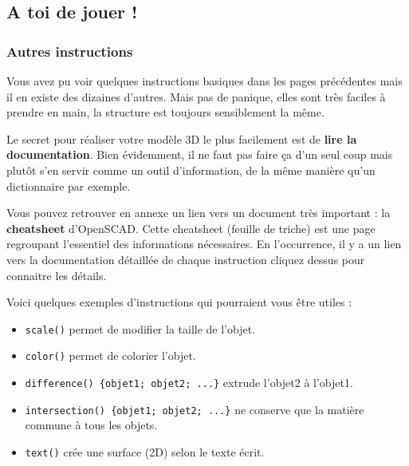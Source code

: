 


\subsection{A toi de jouer !}

\subsubsection{Autres instructions}

Vous avez pu voir quelques instructions basiques dans les pages précédentes mais il en existe des dizaines d'autres.
Mais pas de panique, elles sont très faciles à prendre en main, la structure est toujours sensiblement la même.

Le secret pour réaliser votre modèle 3D le plus facilement est de \textbf{lire la documentation}.
Bien évidemment, il ne faut pas faire ça d'un seul coup mais plutôt s'en servir comme un outil d'information, de la même manière qu'un dictionnaire par exemple.

Vous pouvez retrouver en annexe un lien vers un document très important : la \textbf{cheatsheet} d'OpenSCAD.
Cette cheatsheet (feuille de triche) est une page regroupant l'essentiel des informations nécessaires.
En l'occurrence, il y a un lien vers la documentation détaillée de chaque instruction cliquez dessus pour connaitre les détails.


\vspace{12pt}
Voici quelques exemples d'instructions qui pourraient vous être utiles :
\begin{itemize}
	\item \verb|scale()| permet de modifier la taille de l'objet.
	\item \verb|color()| permet de colorier l'objet.
	\item \verb|difference() {objet1; objet2; ...}| extrude l'objet2 à l'objet1.
	\item \verb|intersection() {objet1; objet2; ...}| ne conserve que la matière commune à tous les objets.
	\item \verb|text()| crée une surface (2D) selon le texte écrit.
\end{itemize}


